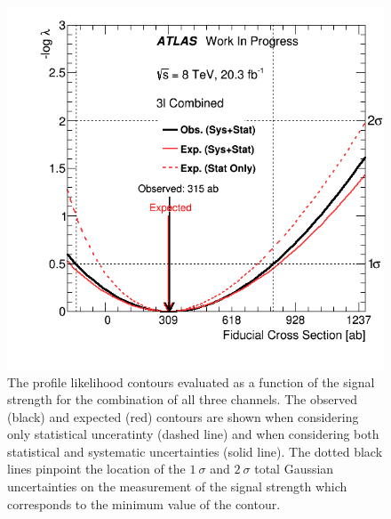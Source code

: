 
\begin{figure}[ht!]
\centering
\includegraphics[scale=0.5]{figures/statistics/measurement/interval/combination.png}
\caption{The profile likelihood contours evaluated as a function of 
the signal strength
for the combination of all three channels. 
The observed (black) and expected (red) contours are shown when 
considering only statistical unceratinty (dashed line) and when considering both statistical and systematic uncertainties (solid line).
The dotted black
lines pinpoint the location of the $1~\sigma$ and $2~\sigma$ total 
Gaussian uncertainties
on the measurement of the signal strength which corresponds to the 
minimum value of the contour.}
\label{fig:stat_measurement_interval_combination}
\end{figure}


